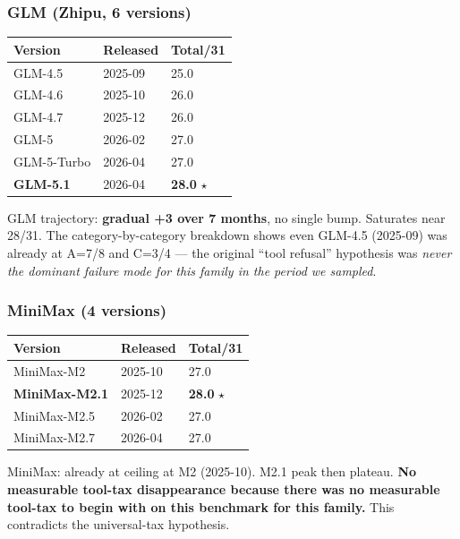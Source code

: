 \documentclass[11pt]{article}
\newcounter{none}
\begin{document}
\subsubsection{GLM (Zhipu, 6 versions)}\label{sec:glm-zhipu-6-versions}

{\def\LTcaptype{none} %
\begin{longtable}[]{@{}lll@{}}
\toprule\noalign{}
Version & Released & Total/31 \\
\midrule\noalign{}
\endhead
\bottomrule\noalign{}
\endlastfoot
GLM-4.5 & 2025-09 & 25.0 \\
GLM-4.6 & 2025-10 & 26.0 \\
GLM-4.7 & 2025-12 & 26.0 \\
GLM-5 & 2026-02 & 27.0 \\
GLM-5-Turbo & 2026-04 & 27.0 \\
\textbf{GLM-5.1} & 2026-04 & \textbf{28.0} $\star$ \\
\end{longtable}
}

GLM trajectory: \textbf{gradual +3 over 7 months}, no single bump.
Saturates near 28/31. The category-by-category breakdown shows even
GLM-4.5 (2025-09) was already at A=7/8 and C=3/4 --- the original ``tool
refusal'' hypothesis was \emph{never the dominant failure mode for this
family in the period we sampled}.

\subsubsection{MiniMax (4 versions)}\label{sec:minimax-4-versions}

{\def\LTcaptype{none} %
\begin{longtable}[]{@{}lll@{}}
\toprule\noalign{}
Version & Released & Total/31 \\
\midrule\noalign{}
\endhead
\bottomrule\noalign{}
\endlastfoot
MiniMax-M2 & 2025-10 & 27.0 \\
\textbf{MiniMax-M2.1} & 2025-12 & \textbf{28.0} $\star$ \\
MiniMax-M2.5 & 2026-02 & 27.0 \\
MiniMax-M2.7 & 2026-04 & 27.0 \\
\end{longtable}
}

MiniMax: already at ceiling at M2 (2025-10). M2.1 peak then plateau.
\textbf{No measurable tool-tax disappearance because there was no
measurable tool-tax to begin with on this benchmark for this family.}
This contradicts the universal-tax hypothesis.
\end{document}
